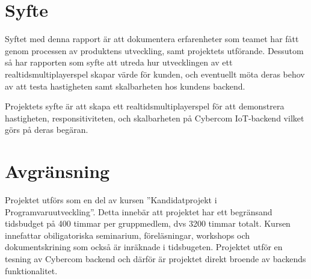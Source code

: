 \section{Syfte}
\label{sec:aim}
Syftet med denna rapport är att dokumentera erfarenheter som teamet har fått genom processen av produktens utveckling, samt projektets utförande. Dessutom så
 har rapporten som syfte att utreda hur utvecklingen av ett realtidsmultiplayerspel  skapar värde för kunden, och eventuellt möta deras behov av att testa hastigheten samt skalbarheten hos kundens backend.


Projektets syfte är att skapa ett realtidsmultiplayerspel för att demonstrera hastigheten, responsitiviteten, och skalbarheten på Cybercom IoT-backend vilket görs på deras begäran.
\section{Avgränsning}
\label{sec:delimitations}

Projektet utförs som en del av kursen ''Kandidatprojekt i Programvaruutveckling''. Detta innebär att projektet har ett begränsand tidsbudget på 400 timmar
per gruppmedlem, dvs 3200 timmar totalt. Kursen innefattar obiligatoriska seminarium, föreläsningar, workshops och dokumentskrining som också är inräknade i tidsbugeten.
Projektet utför en tesning av Cybercom backend och därför är projektet direkt broende av backends funktionalitet.
